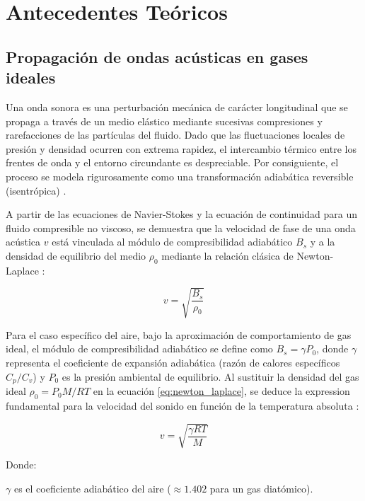 \documentclass[conference]{IEEEtran}
\begin{document}

\section{Antecedentes Teóricos}

\subsection{ Propagación de ondas acústicas en gases ideales}

Una onda sonora es una perturbación mecánica de carácter longitudinal que se propaga a través de un medio elástico mediante sucesivas compresiones y rarefacciones de las partículas del fluido. Dado que las fluctuaciones locales de presión y densidad ocurren con extrema rapidez, el intercambio térmico entre los frentes de onda y el entorno circundante es despreciable. Por consiguiente, el proceso se modela rigurosamente como una transformación adiabática reversible (isentrópica) \cite{morse1986}.

A partir de las ecuaciones de Navier-Stokes y la ecuación de continuidad para un fluido compresible no viscoso, se demuestra que la velocidad de fase de una onda acústica $v$ está vinculada al módulo de compresibilidad adiabático $B_s$ y a la densidad de equilibrio del medio $\rho_0$ mediante la relación clásica de Newton-Laplace \cite{pierce1989}:

\begin{equation}
v = \sqrt{\frac{B_s}{\rho_0}}
\label{eq:newton_laplace}
\end{equation}

Para el caso específico del aire, bajo la aproximación de comportamiento de gas ideal, el módulo de compresibilidad adiabático se define como $B_s = \gamma P_0$, donde $\gamma$ representa el coeficiente de expansión adiabática (razón de calores específicos $C_p/C_v$) y $P_0$ es la presión ambiental de equilibrio. Al sustituir la densidad del gas ideal $\rho_0 = P_0 M / R T$ en la ecuación \eqref{eq:newton_laplace}, se deduce la expression fundamental para la velocidad del sonido en función de la temperatura absoluta \cite{kinsler2000}:

\begin{equation}
v = \sqrt{\frac{\gamma R T}{M}}
\label{eq:v_ideal_gas}
\end{equation}

Donde:

$\gamma$ es el coeficiente adiabático del aire ($\approx 1.402$ para un gas diatómico).
\end{document}
